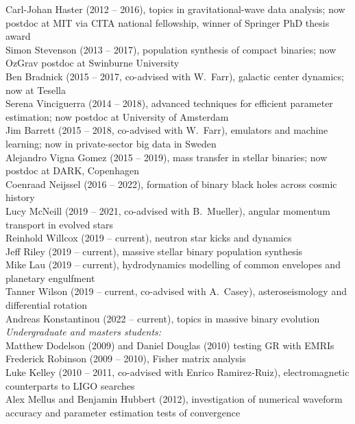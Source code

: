 \documentclass[margin,line]{res}
\begin{document}
\begin{resume}
Carl-Johan Haster (2012 -- 2016), topics in gravitational-wave data analysis; now postdoc at MIT via CITA national fellowship, winner of Springer PhD thesis award\\
Simon Stevenson (2013 -- 2017), population synthesis of compact binaries; now OzGrav postdoc at Swinburne University\\
Ben Bradnick (2015 -- 2017, co-advised with W.~Farr), galactic center dynamics; now at Tesella\\
Serena Vinciguerra (2014 -- 2018), advanced techniques for efficient parameter estimation; now postdoc at University of Amsterdam\\
Jim Barrett (2015 -- 2018, co-advised with W.~Farr), emulators and machine learning; now in private-sector big data in Sweden \\
Alejandro Vigna Gomez (2015 -- 2019), mass transfer in stellar binaries; now postdoc at DARK, Copenhagen\\
Coenraad Neijssel (2016 -- 2022), formation of binary black holes across cosmic history\\
Lucy McNeill (2019 -- 2021, co-advised with B.~Mueller), angular momentum transport in evolved stars\\
Reinhold Willcox (2019 -- current), neutron star kicks and dynamics\\
Jeff Riley (2019 -- current), massive stellar binary population synthesis\\
Mike Lau (2019 -- current), hydrodynamics modelling of common envelopes and planetary engulfment\\
Tanner Wilson (2019 -- current, co-advised with A.~Casey), asteroseismology and differential rotation\\
Andreas Konstantinou (2022 -- current), topics in massive binary evolution
\\
{\it Undergraduate and masters students:}\\
Matthew Dodelson (2009) and Daniel Douglas (2010) testing GR with EMRIs\\ 
Frederick Robinson (2009 -- 2010), Fisher matrix analysis\\
Luke Kelley (2010 -- 2011, co-advised with Enrico Ramirez-Ruiz), electromagnetic counterparts to LIGO searches\\
Alex Mellus and Benjamin Hubbert (2012), investigation of numerical waveform accuracy and parameter estimation tests of convergence\\

\end{resume}
\end{document}
